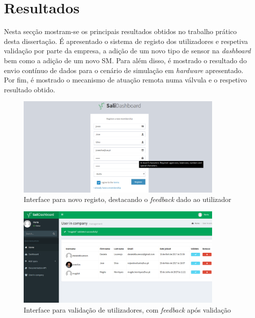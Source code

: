 \section{Resultados}

Nesta secção mostram-se os principais resultados obtidos no trabalho prático desta dissertação. É apresentado o sistema de registo dos utilizadores e respetiva validação por parte da empresa, a adição de um novo tipo de sensor na \textit{dashboard} bem como a adição de um novo \acl{SM}. Para além disso, é mostrado o resultado do envio contínuo de dados para o cenário de simulação em \textit{hardware} apresentado. Por fim, é mostrado o mecanismo de atuação remota numa válvula e o respetivo resultado obtido. 







\newpage


\begin{figure}[h]
	\centering

		\includegraphics[width=0.9\textwidth]{prints-web/register.png}
		\caption{Interface para novo registo, destacando o \textit{feedback} dado ao utilizador}
		\label{novouser}
	
\end{figure}



\begin{figure}[h]
	\centering
		\centering
		\includegraphics[width=0.9\textwidth]{prints-web/validate_company.png}
		\caption{Interface para validação de utilizadores, com \textit{feedback} após validação}
		\label{validateuser}

\end{figure}




